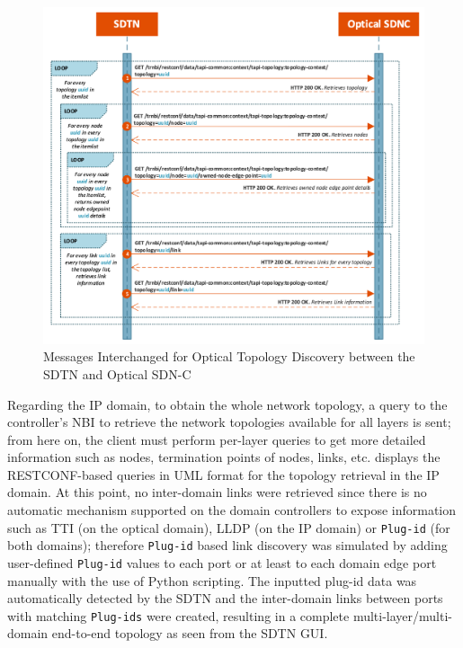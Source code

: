 \documentclass[a4paper,fleqn]{cas-dc}
\begin{document}
\begin{figure}
	\centering
		\includegraphics[width=\linewidth]{figs/optical_topology_workflow_2.png}
	\caption{Messages Interchanged for Optical Topology Discovery between the SDTN and Optical SDN-C}
	\label{FIG:optical_topology_workflow}
\end{figure}

Regarding the IP domain, to obtain the whole network topology, a query to the controller’s NBI to retrieve the network topologies available for all layers is sent; from here on, the client must perform per-layer queries to get more detailed information such as nodes, termination points of nodes, links, etc.  displays the RESTCONF-based queries in UML format for the topology retrieval in the IP domain. 
At this point, no inter-domain links were retrieved since there is no automatic mechanism supported on the domain controllers to expose information such as TTI (on the optical domain), LLDP (on the IP domain) or \texttt{Plug-id} (for both domains); therefore \texttt{Plug-id} based link discovery was simulated by adding user-defined \texttt{Plug-id} values to each port or at least to each domain edge port manually with the use of Python scripting. The inputted plug-id data was automatically detected by the SDTN and the inter-domain links between ports with matching \texttt{Plug-ids} were created, resulting in a complete multi-layer/multi-domain end-to-end topology as seen from the SDTN GUI.
\end{document}
